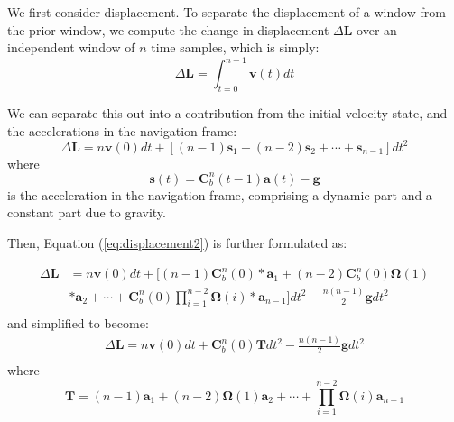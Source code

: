 \documentclass[letterpaper]{article}
\begin{document}
We first consider displacement. To separate the displacement of a window from the prior window, we compute the change in displacement $\Delta \mathbf{L}$ over an independent window of $n$ time samples, which is simply:
	\begin{equation}
    	\label{eq:displacement1}
		\Delta \mathbf{L} =\int_{t=0}^{n-1} \mathbf{v}(t) dt
	\end{equation}

We can separate this out into a contribution from the initial velocity state, and the accelerations in the navigation frame:
	\begin{equation}
    	\label{eq:displacement2}
		\Delta \mathbf{L} =n\mathbf{v}(0)dt+[(n-1)\mathbf{s}_1+(n-2)\mathbf{s}_2+\dotsi+\mathbf{s}_{n-1}]dt^2
	\end{equation}
where \begin{equation}
    	\mathbf{s}(t)=\mathbf{C}_b^n(t-1)\mathbf{a}(t)-\mathbf{g}
      \end{equation} is the acceleration in the navigation frame, comprising a dynamic part and a constant part due to gravity. 

Then, Equation (\ref{eq:displacement2}) is further formulated as:

	\begin{equation}
		\begin{split}
		\Delta \mathbf{L} &=n\mathbf{v}(0)dt+[(n-1)\mathbf{C}_b^n(0)*\mathbf{a}_1+(n-2)\mathbf{C}_b^n(0)\mathbf{\Omega}(1)\\
                  &*\mathbf{a}_2+\dotsi +\mathbf{C}_b^n(0)\displaystyle\prod_{i=1}^{n-2} \mathbf{\Omega}(i)*\mathbf{a}_{n-1}]dt^2-\frac{n(n-1)}{2}\mathbf{g}dt^2\\
		\end{split}
	\end{equation}
and simplified to become:
	\begin{equation}
		\begin{split}
			\Delta \mathbf{L} =n\mathbf{v}(0)dt+ \mathbf{C}_b^n(0) \mathbf{T} dt^2-\frac{n(n-1)}{2}\mathbf{g}dt^2 \\
		\end{split}
	\end{equation}
where \begin{equation}
    	\mathbf{T}=(n-1)\mathbf{a}_1+(n-2)\mathbf{\Omega}(1)\mathbf{a}_2+\dotsi+\displaystyle\prod_{i=1}^{n-2} \mathbf{\Omega}(i)\mathbf{a}_{n-1}
       \end{equation}
\end{document}

